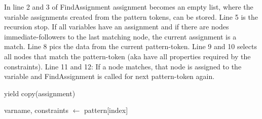 \documentclass[english]{article}
\begin{document}
In line 2 and 3 of FindAssignment assignment becomes an empty list, where the variable assignments created from the pattern tokens, can be stored. Line 5 is the recursion stop. If all variables have an assignment and if there are nodes immediate-followers to the last matching node, the current assignment is a match. Line 8 pics the data from the current pattern-token. Line 9 and 10 selects all nodes that match the pattern-token (aka have all properties required by the constraints). Line 11 and 12: If a node matches, that node is assigned to the variable and FindAssignment is called for next pattern-token again.

\begin{algorithm}
\SetAlgoLined
{}
{
  {
    yield copy(assignment)
  }{
    varname, constraints $\leftarrow$ pattern[index]

  } 
}
\end{algorithm}

\end{document}
